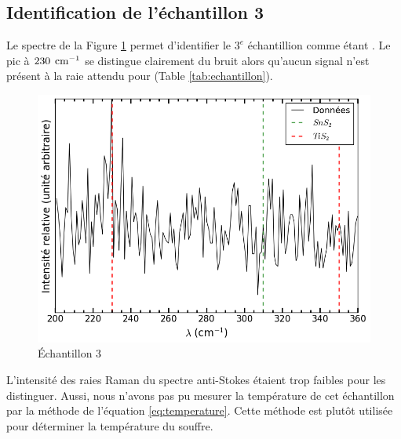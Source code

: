 \documentclass[10pt,letterpaper,twocolumn]{article}
\newcommand{\unit}[1]{\hspace{0.15cm}\text{#1}}
\begin{document}
\subsection{Identification de l'échantillon 3}
Le spectre de la Figure \ref{fig:e3} permet d'identifier le $3^e$ échantillion comme étant . Le pic à $230\unit{cm}^{-1}$ se distingue clairement du bruit alors qu'aucun signal n'est présent à la raie attendu pour  (Table \ref{tab:echantillon}). 
\begin{figure}[H]
	\centering
	\includegraphics[width=0.8\linewidth]{figures/echantillon3.png}
	\caption{Échantillon 3}
	\label{fig:e3}
\end{figure}
L'intensité des raies Raman du spectre anti-Stokes étaient trop faibles pour les distinguer. Aussi, nous n'avons pas pu mesurer la température de cet échantillon par la méthode de l'équation \ref{eq:temperature}. Cette méthode est plutôt utilisée pour déterminer la température du souffre.
\end{document}
